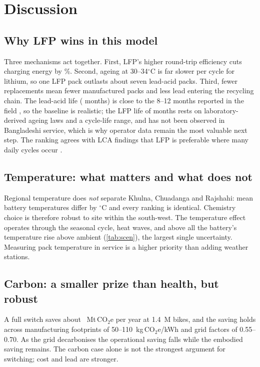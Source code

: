 \section{Discussion}
\subsection{Why LFP wins in this model}
Three mechanisms act together. First, LFP's higher round-trip efficiency cuts charging energy by \gridratio\%. Second, ageing at 30--34$^\circ$C is far slower per cycle for lithium, so one LFP pack outlasts about seven lead-acid packs. Third, fewer replacements mean fewer manufactured packs and less lead entering the recycling chain. The lead-acid life (\lifeLA{} months) is close to the 8--12 months reported in the field \citep{fe2024}, so the baseline is realistic; the LFP life of \lifeLFP{} months rests on laboratory-derived ageing laws and a cycle-life range, and has not been observed in Bangladeshi service, which is why operator data remain the most valuable next step. The ranking agrees with LCA findings that LFP is preferable where many daily cycles occur \citep{jasper2025,yudhistira2022}.

\subsection{Temperature: what matters and what does not}
Regional temperature does \emph{not} separate Khulna, Chuadanga and Rajshahi: mean battery temperatures differ by \Tspread$^\circ$C and every ranking is identical. Chemistry choice is therefore robust to site within the south-west. The temperature effect operates through the seasonal cycle, heat waves, and above all the battery's temperature rise above ambient (\cref{tab:scen}), the largest single uncertainty. Measuring pack temperature in service is a higher priority than adding weather stations.

\subsection{Carbon: a smaller prize than health, but robust}
A full switch saves about \fleetLFPa{}~Mt\,CO$_2$e per year at 1.4~M bikes, and the saving holds across manufacturing footprints of 50--110~kg\,CO$_2$e/kWh and grid factors of 0.55--0.70. As the grid decarbonises the operational saving falls while the embodied saving remains. The carbon case alone is not the strongest argument for switching; cost and lead are stronger.

